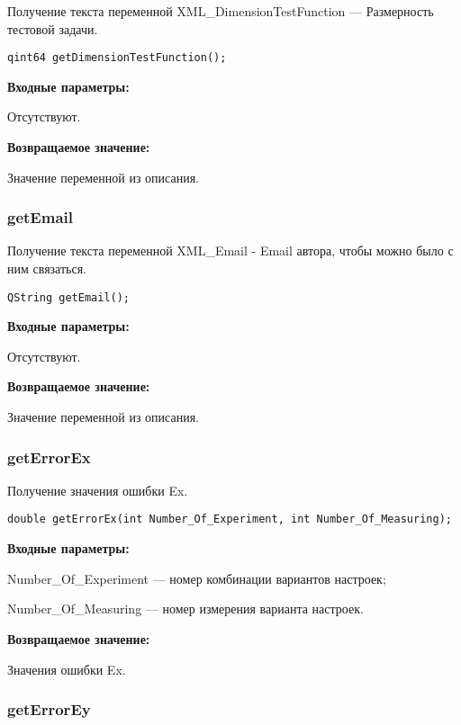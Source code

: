 \documentclass[a4paper,12pt]{article}
\begin{document}
Получение текста переменной  XML\_DimensionTestFunction --- Размерность тестовой задачи.


\begin{lstlisting}[label=code_syntax_getDimensionTestFunction,caption=Синтаксис]
qint64 getDimensionTestFunction();
\end{lstlisting}

\textbf{Входные параметры:}

Отсутствуют.

\textbf{Возвращаемое значение:}

Значение переменной из описания.


\subsubsection{getEmail}\label{getEmail}

Получение текста переменной  XML\_Email - Email автора, чтобы можно было с ним связаться.


\begin{lstlisting}[label=code_syntax_getEmail,caption=Синтаксис]
QString getEmail();
\end{lstlisting}

\textbf{Входные параметры:}

Отсутствуют.

\textbf{Возвращаемое значение:}

Значение переменной из описания.


\subsubsection{getErrorEx}\label{getErrorEx}

Получение значения ошибки Ex.


\begin{lstlisting}[label=code_syntax_getErrorEx,caption=Синтаксис]
double getErrorEx(int Number_Of_Experiment, int Number_Of_Measuring);
\end{lstlisting}

\textbf{Входные параметры:}

Number\_Of\_Experiment --- номер комбинации вариантов настроек;
 
    Number\_Of\_Measuring --- номер измерения варианта настроек.

\textbf{Возвращаемое значение:}

 
Значения ошибки Ex.


\subsubsection{getErrorEy}\label{getErrorEy}
\end{document}
